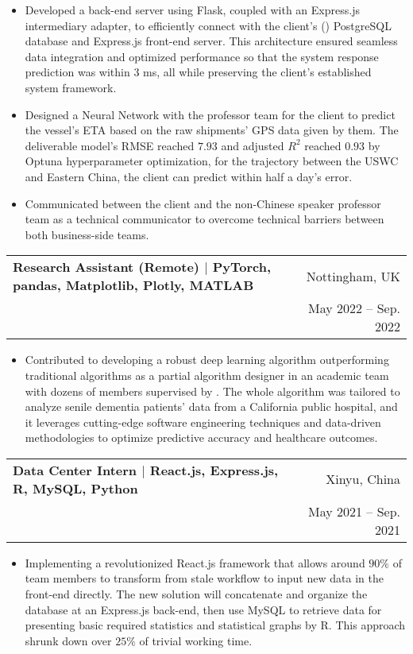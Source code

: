 \documentclass[letterpaper,10pt]{article}
\makeatletter
\newcommand{\link}[1]{\color{myBlue}{#1}}
\newcommand{\skill}[1]{\small{\textnormal{$|$ {#1}}}}
\newcommand{\resumeItem}[1]{
  \item\small{
    {#1 \vspace{-2pt}}
  }
}
\newcommand{\resumeSubheading}[4]{
  \vspace{-2pt}\item
    \begin{tabular*}{0.97\textwidth}[t]{l@{\extracolsep{\fill}}r}
      \textbf{#1} & #2 \\
      \small#3 & \small #4 \\
    \end{tabular*}\vspace{-7pt}
}
\newcommand{\resumeSubSubheading}[2]{
    \item
    \begin{tabular*}{0.97\textwidth}{l@{\extracolsep{\fill}}r}
      \textit{\small#1} & \textit{\small #2} \\
    \end{tabular*}\vspace{-7pt}
}
\newcommand{\resumeSubHeadingListEnd}{\end{itemize}}
\newcommand{\resumeItemListStart}{\begin{itemize}}
\newcommand{\resumeItemListEnd}{\end{itemize}\vspace{-5pt}}
\makeatother
\begin{document}
\resumeItemListStart
\resumeItem{Developed a back-end server using Flask, coupled with an Express.js intermediary adapter, to efficiently connect with the client's (\href{https://www.jusdausa.com/}{\link{Jusda}}) PostgreSQL database and Express.js front-end server. This architecture ensured seamless data integration and optimized performance so that the system response prediction was within 3 ms, all while preserving the client's established system framework.}
\resumeItem{Designed a Neural Network with the professor team for the client to predict the vessel's ETA based on the raw shipments' GPS data given by them. The deliverable model's RMSE reached $7.93$ and adjusted $R^2$ reached $0.93$ by Optuna hyperparameter optimization, for the trajectory between the USWC and Eastern China, the client can predict within half a day's error.}
\resumeItem{Communicated between the client and the non-Chinese speaker professor team as a technical communicator to overcome technical barriers between both business-side teams.}
\resumeItemListEnd

\resumeSubheading
{Research Assistant (Remote) \skill{PyTorch, pandas, Matplotlib, Plotly, MATLAB}}{Nottingham, UK}
{\href{https://minghsiehece.usc.edu/}{\link{University of Southern California}}}{May 2022 -- Sep. 2022}
\resumeItemListStart
\resumeItem{Contributed to developing a robust deep learning algorithm outperforming traditional algorithms as a partial algorithm designer in an academic team with dozens of members supervised by \href{https://minghsiehece.usc.edu/directory/faculty/profile/?lname=Bogdan&fname=Paul}{\link{Professor Paul Bogdan}}. The whole algorithm was tailored to analyze senile dementia patients' data from a California public hospital, and it leverages cutting-edge software engineering techniques and data-driven methodologies to optimize predictive accuracy and healthcare outcomes.}
\resumeItemListEnd

\resumeSubheading
{Data Center Intern \skill{React.js, Express.js, R, MySQL, Python}}{Xinyu, China}
{\href{http://www.sgcc.com.cn/html/sgcc_en/index.shtml}{\link{State Grid Corporation of China}}}{May 2021 -- Sep. 2021}
\resumeItemListStart
\resumeItem{Implementing a revolutionized React.js framework that allows around $90\%$ of team members to transform from stale workflow to input new data in the front-end directly. The new solution will concatenate and organize the database at an Express.js back-end, then use MySQL to retrieve data for presenting basic required statistics and statistical graphs by R. This approach shrunk down over $25\%$ of trivial working time.}
\resumeItemListEnd
\end{document}
